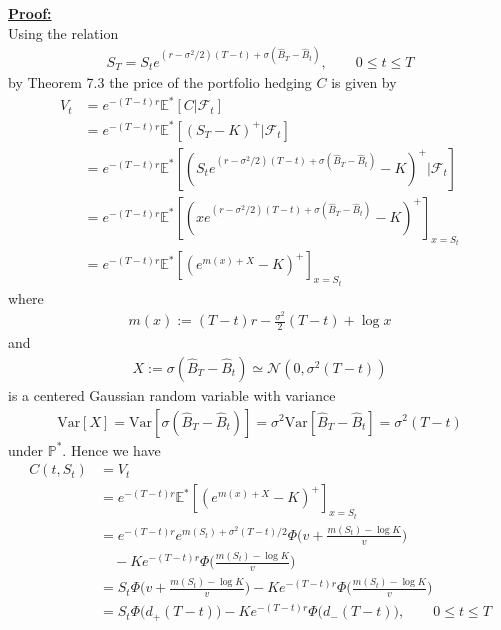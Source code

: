 \documentclass[12pt]{extarticle}
\newcommand{\<}{\langle}
\renewcommand{\>}{\rangle}
\theoremstyle{definition}
\begin{document}
\underline{\textbf{Proof:}}\\
Using the relation
\begin{align*}
    S_T = S_t e^{(r-\sigma^2/2)(T-t) +\sigma(\hat{B}_T -\hat{B}_t)}, \qquad 0\leq t \leq T
\end{align*}
by Theorem 7.3 the price of the portfolio hedging $C$ is given by
\begin{align*}
    V_t &= e^{-(T-t)r}\mathbb{E}^*[C|\mathcal{F}_t]\\
    &= e^{-(T-t)r}\mathbb{E}^*[(S_T -K)^+|\mathcal{F}_t]\\
    &= e^{-(T-t)r}\mathbb{E}^*[(S_t e^{(r-\sigma^2/2)(T-t) +\sigma(\hat{B}_T -\hat{B}_t)} -K)^+|\mathcal{F}_t] \\
    &= e^{-(T-t)r}\mathbb{E}^*[(x e^{(r-\sigma^2/2)(T-t) +\sigma(\hat{B}_T -\hat{B}_t)} -K)^+]_{x=S_t}\\
    &= e^{-(T-t)r}\mathbb{E}^*[(e^{m(x) +X} -K)^+]_{x=S_t}
\end{align*}
where 
\begin{align*}
    m(x):= (T-t)r -\frac{\sigma^2}{2}(T-t) +\log x
\end{align*}
and
\begin{align*}
    X := \sigma(\hat{B}_T -\hat{B}_t) \simeq \mathcal{N}(0,\sigma^2 (T-t))
\end{align*}
is a centered Gaussian random variable with variance
\begin{align*}
    \text{Var}[X] = \text{Var}[\sigma(\hat{B}_T -\hat{B}_t)] = \sigma^2\text{Var}[\hat{B}_T -\hat{B}_t] = \sigma^2 (T-t)
\end{align*}
under $\mathbb{P}^*$. Hence we have
\begin{align*}
    C(t,S_t) &= V_t\\
    &= e^{-(T-t)r}\mathbb{E}^*[(e^{m(x) +X} -K)^+]_{x=S_t}\\
    &= e^{-(T-t)r} e^{m(S_t)+\sigma^2(T-t)/2}\Phi\bigg(v + \frac{m(S_t) -\log K}{v}\bigg)\\
    & \quad -Ke^{-(T-t)r}\Phi\bigg(\frac{m(S_t) -\log K}{v}\bigg)\\
    &= S_t\Phi\bigg(v + \frac{m(S_t) -\log K}{v}\bigg) -Ke^{-(T-t)r}\Phi\bigg(\frac{m(S_t) -\log K}{v}\bigg)\\
    &= S_t \Phi\big(d_+(T-t)\big) -Ke^{-(T-t)r} \Phi\big(d_-(T-t)\big), \qquad 0 \leq t \leq T
\end{align*}
\end{document}
